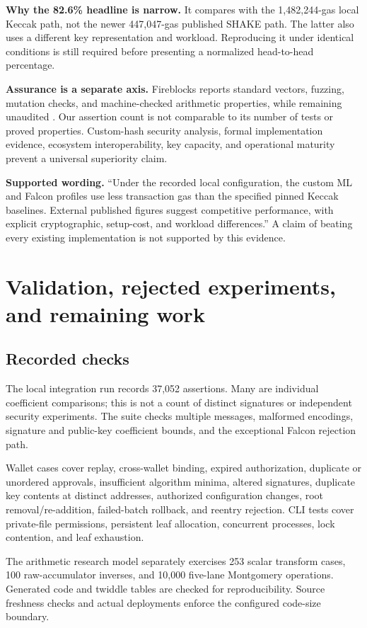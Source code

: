 \documentclass[11pt,a4paper]{article}
\newcommand{\callout}[1]{\par\smallskip\noindent\colorbox{pale}{\parbox{\dimexpr\linewidth-2\fboxsep\relax}{\small #1}}\par\smallskip}
\begin{document}
\textbf{Why the 82.6\% headline is narrow.} It compares with the 1,482,244-gas
local Keccak path, not the newer 447,047-gas published SHAKE path. The latter
also uses a different key representation and workload. Reproducing it under
identical conditions is still required before presenting a normalized
head-to-head percentage.

\textbf{Assurance is a separate axis.} Fireblocks reports standard vectors,
fuzzing, mutation checks, and machine-checked arithmetic properties, while
remaining unaudited \cite{fireblocks}. Our assertion count is not comparable
to its number of tests or proved properties. Custom-hash security analysis,
formal implementation evidence, ecosystem interoperability, key capacity,
and operational maturity prevent a universal superiority claim.

\callout{\textbf{Supported wording.} ``Under the recorded local configuration,
the custom ML and Falcon profiles use less transaction gas than the specified
pinned Keccak baselines. External published figures suggest competitive
performance, with explicit cryptographic, setup-cost, and workload
differences.'' A claim of beating every existing implementation is not
supported by this evidence.}

\newpage
\section{Validation, rejected experiments, and remaining work}
\subsection{Recorded checks}
The local integration run records 37,052 assertions. Many are individual
coefficient comparisons; this is not a count of distinct signatures or
independent security experiments. The suite checks multiple messages,
malformed encodings, signature and public-key coefficient bounds, and the
exceptional Falcon rejection path.

Wallet cases cover replay, cross-wallet binding, expired authorization,
duplicate or unordered approvals, insufficient algorithm minima, altered
signatures, duplicate key contents at distinct addresses, authorized
configuration changes, root removal/re-addition, failed-batch rollback, and
reentry rejection. CLI tests cover private-file permissions, persistent leaf
allocation, concurrent processes, lock contention, and leaf exhaustion.

The arithmetic research model separately exercises 253 scalar transform
cases, 100 raw-accumulator inverses, and 10,000 five-lane Montgomery operations.
Generated code and twiddle tables are checked for reproducibility. Source
freshness checks and actual deployments enforce the configured code-size
boundary.
\end{document}
